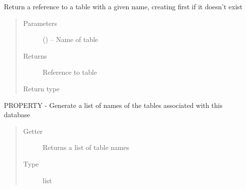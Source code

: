 \documentclass[letterpaper,10pt,english]{sphinxmanual}
\begin{document}
\begin{fulllineitems}
\begin{fulllineitems}
\end{fulllineitems}


\begin{fulllineitems}
\label{\detokenize{index:mamba.Database.table}}
Return a reference to a table with a given name, creating first if it doesn't exist
\begin{quote}\begin{description}
\item[{Parameters}] \leavevmode
{} () -- Name of table

\item[{Returns}] \leavevmode
Reference to table

\item[{Return type}] \leavevmode
{\hyperref[\detokenize{index:mamba.Table}]{}}

\end{description}\end{quote}

\end{fulllineitems}


\begin{fulllineitems}
\label{\detokenize{index:mamba.Database.tables}}
PROPERTY - Generate a list of names of the tables associated with this database
\begin{quote}\begin{description}
\item[{Getter}] \leavevmode
Returns a list of table names

\item[{Type}] \leavevmode
list

\end{description}\end{quote}

\end{fulllineitems}


\end{fulllineitems}

\end{document}
